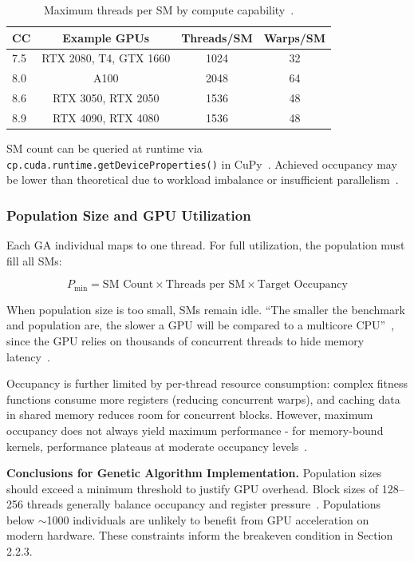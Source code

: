 \begin{table}[H]
\centering
\small
\begin{tabular}{@{}lccc@{}}
\toprule
\textbf{CC} & \textbf{Example GPUs} & \textbf{Threads/SM} & \textbf{Warps/SM} \\
\midrule
7.5 & RTX 2080, T4, GTX 1660 & 1024 & 32 \\
8.0 & A100 & 2048 & 64 \\
8.6 & RTX 3050, RTX 2050 & 1536 & 48 \\
8.9 & RTX 4090, RTX 4080 & 1536 & 48 \\
\bottomrule
\end{tabular}
\caption{Maximum threads per SM by compute capability~\cite{nvidia2024programming}.}
\label{tab:threads_per_sm}
\end{table}

SM count can be queried at runtime via \texttt{cp.cuda.runtime.getDeviceProperties()} in CuPy~\cite{cupy_docs}. Achieved occupancy may be lower than theoretical due to workload imbalance or insufficient parallelism~\cite{nvidia2024occupancy}.

\subsubsection*{Population Size and GPU Utilization}

Each GA individual maps to one thread. For full utilization, the population must fill all SMs:

\begin{equation}
P_{\min} = \text{SM Count} \times \text{Threads per SM} \times \text{Target Occupancy}
\label{eq:pmin}
\end{equation}

When population size is too small, SMs remain idle. ``The smaller the benchmark and population are, the slower a GPU will be compared to a multicore CPU''~\cite{jaros2012fair}, since the GPU relies on thousands of concurrent threads to hide memory latency~\cite{pospichal2010parallel,carpentries_gpu}.

Occupancy is further limited by per-thread resource consumption: complex fitness functions consume more registers (reducing concurrent warps), and caching data in shared memory reduces room for concurrent blocks. However, maximum occupancy does not always yield maximum performance - for memory-bound kernels, performance plateaus at moderate occupancy levels~\cite{volkov2010occupancy}.

\textbf{Conclusions for Genetic Algorithm Implementation.} Population sizes should exceed a minimum threshold to justify GPU overhead. Block sizes of 128--256 threads generally balance occupancy and register pressure~\cite{nvidia_occupancy}. Populations below $\sim$1000 individuals are unlikely to benefit from GPU acceleration on modern hardware. These constraints inform the breakeven condition in Section 2.2.3.

